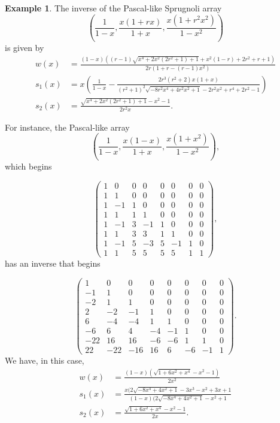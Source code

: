 \documentclass[12pt,reqno]{article}
\theoremstyle{definition}
\newtheorem{example}[theorem]{Example}
\begin{document}
\begin{example} The inverse of the Pascal-like Sprugnoli array  
$$\left(\frac{1}{1-x}, \frac{x(1+rx)}{1+x}, \frac{x(1+r^2x^2)}{1-x^2}\right)$$ is given by 
\begin{align*}
w(x)&=\frac{(1-x)((r-1)\sqrt{x^4+2x^2(2r^2+1)+1}+x^2(1-r)+2r^2+r+1)}{2r(1+r-(r-1)x^2)}\\
s_1(x)&=x\left(\frac{1}{1-x}-\frac{2r^3(r^2+2)x(1+x)}{(r^2+1)^2\sqrt{-8r^2x^4+4r^2x^2+1}-2r^2x^2+r^4+2r^2-1}\right)\\
s_2(x)&=\frac{\sqrt{x^4+2x^2(2r^2+1)+1}-x^2-1}{2r^2x}.\end{align*}

For instance, the Pascal-like array $$\left(\frac{1}{1-x}, \frac{x(1-x)}{1+x}, \frac{x(1+x^2)}{1-x^2}\right),$$ which begins 


\[
\begin{pmatrix}
1 & 0 & 0 & 0 & 0 & 0 & 0 & 0 \\
1 & 1 & 0 & 0 & 0 & 0 & 0 & 0 \\
1 & -1 & 1 & 0 & 0 & 0 & 0 & 0 \\
1 & 1 & 1 & 1 & 0 & 0 & 0 & 0 \\
1 & -1 & 3 & -1 & 1 & 0 & 0 & 0 \\
1 & 1 & 3 & 3 & 1 & 1 & 0 & 0 \\
1 & -1 & 5 & -3 & 5 & -1 & 1 & 0 \\
1 & 1 & 5 & 5 & 5 & 5 & 1 & 1
\end{pmatrix},
\]
has an inverse that begins 


\[
\begin{pmatrix}
1 & 0 & 0 & 0 & 0 & 0 & 0 & 0 \\
-1 & 1 & 0 & 0 & 0 & 0 & 0 & 0 \\
-2 & 1 & 1 & 0 & 0 & 0 & 0 & 0 \\
2 & -2 & -1 & 1 & 0 & 0 & 0 & 0 \\
6 & -4 & -4 & 1 & 1 & 0 & 0 & 0 \\
-6 & 6 & 4 & -4 & -1 & 1 & 0 & 0 \\
-22 & 16 & 16 & -6 & -6 & 1 & 1 & 0 \\
22 & -22 & -16 & 16 & 6 & -6 & -1 & 1
\end{pmatrix}.
\]
We have, in this case,
\begin{align*}
w(x)&=\frac{(1-x)(\sqrt{1+6x^2+x^4}-x^2-1)}{2x^2}\\
s_1(x)&=\frac{x(2 \sqrt{-8x^4+4x^2+1}-3x^3-x^2+3x+1}{(1-x)(2\sqrt{-8x^4+4x^2+1}-x^2+1}\\
s_2(x)&=\frac{\sqrt{1+6x^2+x^4}-x^2-1}{2x}.\end{align*}
\end{example}
\end{document}
